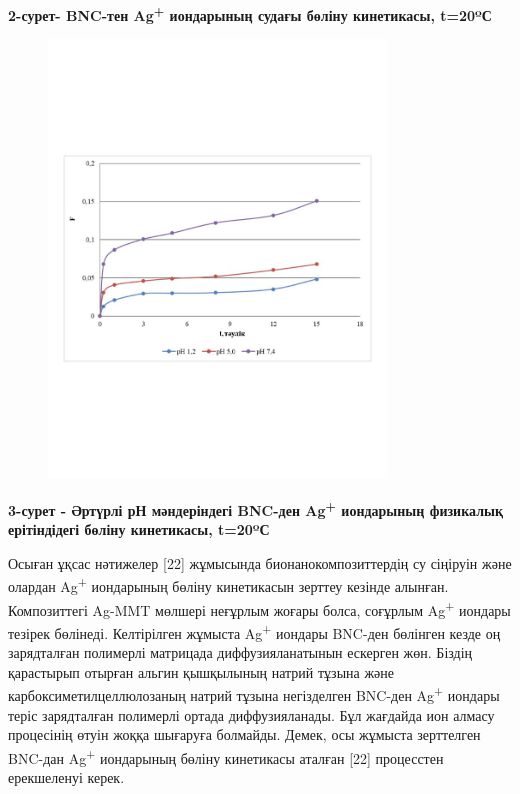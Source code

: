 {\bfseries 2-сурет- BNC-тен Ag\textsuperscript{+} иондарының судағы бөліну
кинетикасы, t=20ºС}

\begin{figure}[H]
	\centering
	\includegraphics[width=0.8\textwidth]{media/chem/image16}
	\caption*{}
\end{figure}


{\bfseries 3-сурет - Әртүрлі рН мәндеріндегі BNC-ден Ag\textsuperscript{+}
иондарының физикалық ерітіндідегі бөліну кинетикасы, t=20ºС}

Осыған ұқсас нәтижелер {[}22{]} жұмысында бионанокомпозиттердің су
сіңіруін және олардан Ag\textsuperscript{+} иондарының бөліну
кинетикасын зерттеу кезінде алынған. Композиттегі Ag-MMT мөлшері
неғұрлым жоғары болса, соғұрлым Ag\textsuperscript{+} иондары тезірек
бөлінеді. Келтірілген жұмыста Ag\textsuperscript{+} иондары BNC-ден
бөлінген кезде оң зарядталған полимерлі матрицада диффузияланатынын
ескерген жөн. Біздің қарастырып отырған альгин қышқылының натрий тұзына
және карбоксиметилцеллюлозаның натрий тұзына негізделген BNC-ден
Ag\textsuperscript{+} иондары теріс зарядталған полимерлі ортада
диффузияланады. Бұл жағдайда ион алмасу процесінің өтуін жоққа шығаруға
болмайды. Демек, осы жұмыста зерттелген BNC-дан Ag\textsuperscript{+}
иондарының бөліну кинетикасы аталған {[}22{]} процесстен ерекшеленуі
керек.

